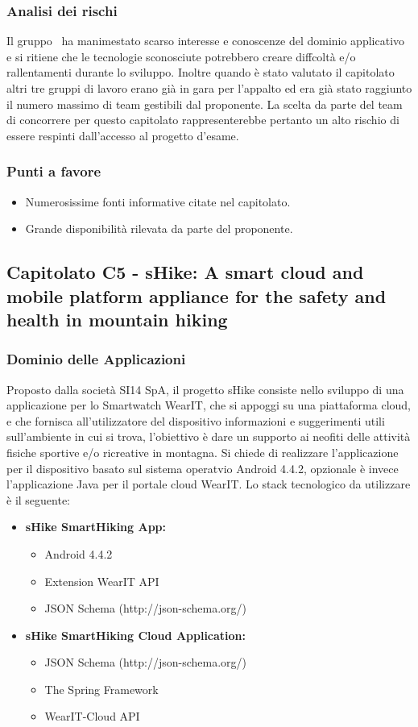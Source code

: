   \subsubsection{Analisi dei rischi}
  Il gruppo \gruppo\ ha manimestato scarso interesse e conoscenze del dominio applicativo e si ritiene che le tecnologie sconosciute 
  potrebbero creare diffcoltà e/o rallentamenti durante lo sviluppo.
  Inoltre quando è stato valutato il capitolato altri tre gruppi di lavoro erano già in gara per l'appalto ed era già stato raggiunto il numero massimo di team gestibili dal proponente. La scelta da parte del team di concorrere per questo capitolato rappresenterebbe pertanto un alto rischio di essere respinti dall'accesso al progetto d'esame.
  \subsubsection{Punti a favore}
  \begin{itemize}
  	\item Numerosissime fonti informative citate nel capitolato.
  	\item Grande disponibilità rilevata da parte del proponente.
  \end{itemize}
\newpage
\subsection{Capitolato C5 - sHike: A smart cloud and mobile platform appliance for the safety and health in mountain hiking}
  \subsubsection{Dominio delle Applicazioni}
  Proposto dalla società SI14 SpA, il progetto sHike consiste nello sviluppo di una applicazione per lo Smartwatch WearIT, che si appoggi su una piattaforma cloud, e che fornisca all'utilizzatore del dispositivo informazioni e suggerimenti utili sull'ambiente in cui si trova, l'obiettivo è dare un supporto ai neofiti delle attività fisiche sportive e/o ricreative in montagna. Si chiede di realizzare l'applicazione per il dispositivo basato sul sistema operatvio Android 4.4.2, opzionale è invece l'applicazione Java per il portale cloud WearIT. Lo stack tecnologico da utilizzare è il seguente:
  \begin{itemize}
  \item \textbf{sHike SmartHiking App:}
     \begin{itemize}
	     \item Android 4.4.2
	     \item Extension WearIT API
		 \item JSON Schema (http://json-schema.org/)
     \end{itemize}
  \item \textbf{sHike SmartHiking Cloud Application:}
     \begin{itemize}
       	\item JSON Schema (http://json-schema.org/)
       	\item The Spring Framework
	    \item WearIT-Cloud API
     \end{itemize}
  \end{itemize}
